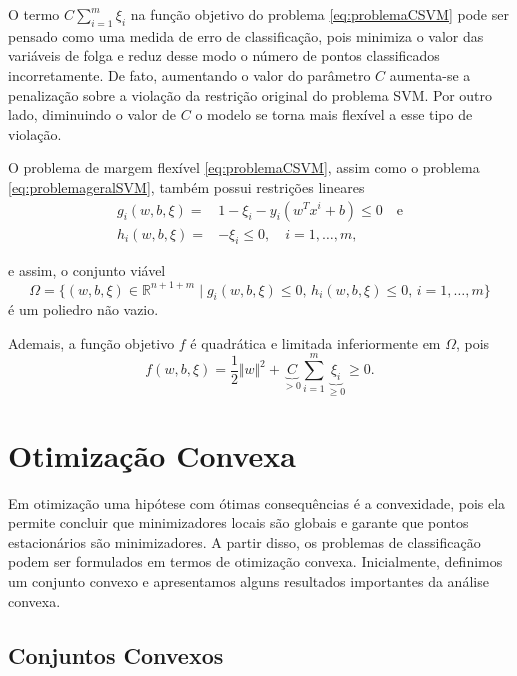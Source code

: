\documentclass[12pt,a4paper]{scrartcl}
\def\RR{\mathds{R}}
\theoremstyle{definition}%
\begin{document}
O termo $C \sum_{i=1}^{m} \xi_{i}$ na função objetivo do problema \eqref{eq:problemaCSVM} pode ser pensado como uma medida de erro de classificação, pois minimiza o valor das variáveis de folga e reduz desse modo o número de pontos classificados incorretamente. De fato, aumentando o valor do parâmetro $C$ aumenta-se a penalização sobre a violação da restrição original do problema SVM. Por outro lado, diminuindo o valor de $C$ o modelo se torna mais flexível a esse tipo de violação. 

O problema de margem flexível \eqref{eq:problemaCSVM}, assim como o problema \eqref{eq:problemageralSVM}, também possui restrições lineares 
\begin{align} 
g_{i}(w,b,\xi) = & 1-\xi_{i} - y_i(w^{T}x^{i}+b) \leq 0 \quad \text{e} \\
h_{i}(w,b,\xi) = & - \xi_{i} \leq 0, \quad i=1, \ldots, m,
\end{align}

e assim, o conjunto viável
\[
\Omega = \{(w,b,\xi) \in \RR^{n+1+m} \mid g_{i}(w,b,\xi) \leq 0, \, h_{i}(w,b,\xi) \leq 0, \, i=1, \ldots, m \} 
\]
é um poliedro não vazio.

Ademais, a função objetivo $f$ é quadrática e limitada inferiormente em $\Omega$, pois 
\[
f(w,b,\xi) = \dfrac{1}{2} \Vert w\Vert^{2} + \underbrace{C}_{> 0} \sum_{i=1}^{m} \underbrace{\xi_{i}}_{\geq 0} \geq 0.
\]



\section{Otimização Convexa}

Em otimização uma hipótese com ótimas consequências é a convexidade, pois ela permite concluir que minimizadores locais são globais e garante que pontos estacionários são minimizadores. A partir disso, os problemas de classificação podem ser formulados em termos de otimização convexa.
Inicialmente, definimos um conjunto convexo e apresentamos alguns resultados importantes da análise convexa.

\subsection{Conjuntos Convexos}
\end{document}
